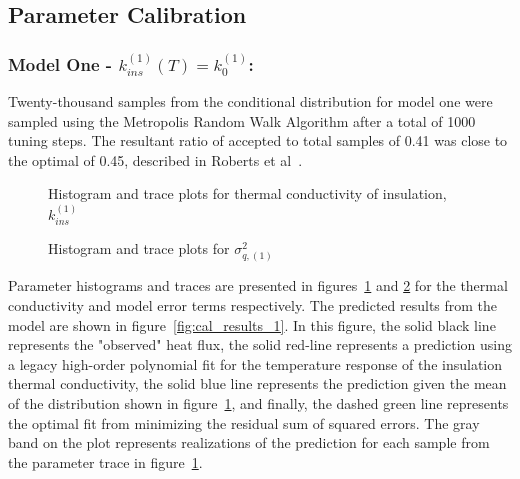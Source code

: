 \documentclass[article]{proc}
\begin{document}

    \subsection{Parameter Calibration}

        \subsubsection{Model One - $k^{(1)}_{ins}(T) = k^{(1)}_0$:}

        Twenty-thousand samples from the conditional distribution for model one were sampled using the Metropolis Random Walk Algorithm after a total of 1000 tuning steps. The resultant ratio of accepted to total samples of 0.41 was close to the optimal of 0.45, described in Roberts et al~\cite{Roberts:1997}.

        \begin{figure}[b!]
            \centering
            \qquad
            \caption{Histogram and trace plots for thermal conductivity of insulation, $k^{(1)}_{ins}$}
            \label{fig:param_trace_1}
        \end{figure}

        \begin{figure}[b!]
            \centering
            \qquad
            \caption{Histogram and trace plots for $\sigma_{q,(1)}^2$}
            \label{fig:sigma_trace_1}
        \end{figure}

        Parameter histograms and traces are presented in figures~\ref{fig:param_trace_1} and \ref{fig:sigma_trace_1} for the thermal conductivity and model error terms respectively. The predicted results from the model are shown in figure~\ref{fig:cal_results_1}. In this figure, the solid black line represents the "observed" heat flux, the solid red-line represents a prediction using a legacy high-order polynomial fit for the temperature response of the insulation thermal conductivity, the solid blue line represents the prediction given the mean of the distribution shown in figure~\ref{fig:param_trace_1}, and finally, the dashed green line represents the optimal fit from minimizing the residual sum of squared errors. The gray band on the plot represents realizations of the prediction for each sample from the parameter trace in figure~\ref{fig:param_trace_1}. 
\end{document}
